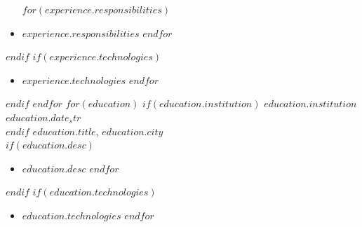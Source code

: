 \documentclass[a4paper,10pt]{article}
\begin{document}
    \begin{itemize}
        $for(experience.responsibilities)$
        \item $experience.responsibilities$
        $endfor$
    \end{itemize}
    $endif$
    $if(experience.technologies)$
     \\
    \begin{itemize}
        $for(experience.technologies)$
        \item $experience.technologies$
        $endfor$
    \end{itemize}
    $endif$
    \vspace{0.2cm}
$endfor$
$for(education)$
    $if(education.institution)$ \textbf{$education.institution$} \hfill $education.date_str$ \\ $endif$
    $education.title$, $education.city$ \\
    $if(education.desc)$
     \\
    \begin{itemize}
        $for(education.desc)$
        \item $education.desc$
        $endfor$
    \end{itemize}
    $endif$
    $if(education.technologies)$
     \\
    \begin{itemize}
        $for(education.technologies)$
        \item $education.technologies$
        $endfor$
    \end{itemize}
\end{document}
